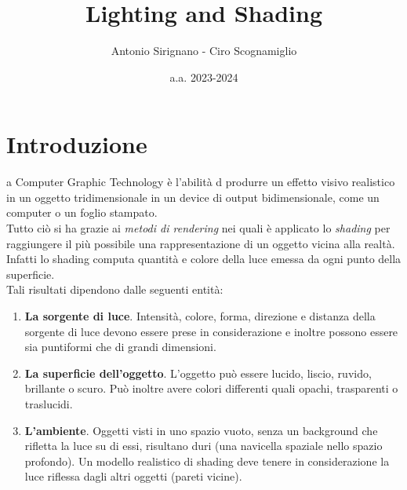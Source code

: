 \documentclass[9pt,a4paper,twoside]{tau}
\title{Lighting and Shading}
\author{Antonio Sirignano - Ciro Scognamiglio}
\date{a.a. 2023-2024}
\begin{document}
		
	\maketitle
	\thispagestyle{firststyle}
	\tauabstract
	\tableofcontents


\section{Introduzione}

    a Computer Graphic Technology è l'abilità d produrre un effetto visivo realistico in un oggetto tridimensionale in un device di output bidimensionale, come un computer o un foglio stampato.\\
    Tutto ciò si ha grazie ai \textit{metodi di rendering} nei quali è applicato lo \textit{shading} per raggiungere il più possibile una rappresentazione di un oggetto vicina alla realtà.\\ 
    Infatti lo shading computa quantità e colore della luce emessa da ogni punto della superficie.\\
    Tali risultati dipendono dalle seguenti entità:
    \begin{enumerate}
    	\item \textbf{La sorgente di luce}. Intensità, colore, forma, direzione e distanza della sorgente di luce devono essere prese in considerazione e inoltre possono essere sia puntiformi che di grandi dimensioni.
    	\item \textbf{La superficie dell'oggetto}. L'oggetto può essere lucido, liscio, ruvido, brillante o scuro. Può inoltre avere colori differenti quali opachi, trasparenti o traslucidi. 
    	\item \textbf{L'ambiente}. Oggetti visti in uno spazio vuoto, senza un background che rifletta la luce su di essi, risultano duri (una navicella spaziale nello spazio profondo). Un modello realistico di shading deve tenere in considerazione la luce riflessa dagli altri oggetti (pareti vicine).
    \end{enumerate}
\end{document}
